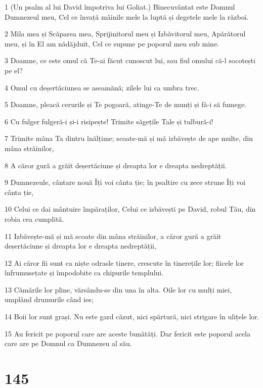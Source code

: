 \par 1 (Un psalm al lui David împotriva lui Goliat.) Binecuvântat este Domnul Dumnezeul meu, Cel ce învață mâinile mele la luptă și degetele mele la război.
\par 2 Mila mea și Scăparea mea, Sprijinitorul meu și Izbăvitorul meu, Apărătorul meu, și în El am nădăjduit, Cel ce supune pe poporul meu sub mine.
\par 3 Doamne, ce este omul că Te-ai făcut cunoscut lui, sau fiul omului că-l socotești pe el?
\par 4 Omul cu deșertăciunea se aseamănă; zilele lui ca umbra trec.
\par 5 Doamne, pleacă cerurile și Te pogoară, atinge-Te de munți și fă-i să fumege.
\par 6 Cu fulger fulgeră-i și-i risipește! Trimite săgețile Tale și tulbură-i!
\par 7 Trimite mâna Ta dintru înălțime; scoate-mă și mă izbăvește de ape multe, din mâna străinilor,
\par 8 A căror gură a grăit deșertăciune și dreapta lor e dreapta nedreptății.
\par 9 Dumnezeule, cântare nouă Îți voi cânta ție; în psaltire cu zece strune Îți voi cânta ție,
\par 10 Celui ce dai mântuire împăraților, Celui ce izbăvești pe David, robul Tău, din robia cea cumplită.
\par 11 Izbăvește-mă și mă scoate din mâna străinilor, a căror gură a grăit deșertăciune și dreapta lor e dreapta nedreptății,
\par 12 Ai căror fii sunt ca niște odrasle tinere, crescute în tinerețile lor; fiicele lor înfrumusețate și împodobite ca chipurile templului.
\par 13 Cămările lor pline, vărsându-se din una în alta. Oile lor cu mulți miei, umplând drumurile când ies;
\par 14 Boii lor sunt grași. Nu este gard căzut, nici spărtură, nici strigare în ulițele lor.
\par 15 Au fericit pe poporul care are aceste bunătăți. Dar fericit este poporul acela care are pe Domnul ca Dumnezeu al său.

\chapter{145}

